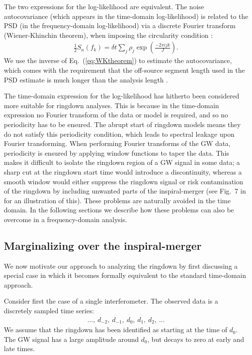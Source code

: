 The two expressions for the log-likelihood are equivalent.
The noise autocovariance (which appears in the time-domain log-likelihood) is related to the PSD (in the frequency-domain log-likelihood) via a discrete Fourier transform (Wiener-Khinchin theorem), when imposing the circularity condition \cite{Isi:2021iql}:
\begin{align} \label{eq:WKtheorem}
	\frac{1}{2}S_n(f_k) = \delta t \sum_{j}\rho_j \exp\left(\frac{-2\pi ijk}{J}\right).
\end{align}
We use the inverse of Eq.~(\ref{eq:WKtheorem}) to estimate the autocovariance, which comes with the requirement that the off-source segment length used in the PSD estimate is much longer than the analysis length \cite{Isi:2021iql}.

The time-domain expression for the log-likelihood has hitherto been considered more suitable for ringdown analyses.
This is because in the time-domain expression no Fourier transform of the data or model is required, and so no periodicity has to be ensured.
The abrupt start of ringdown models means they do not satisfy this periodicity condition, which leads to spectral leakage upon Fourier transforming. 
When performing Fourier transforms of the GW data, periodicity is ensured by applying window functions to taper the data.
This makes it difficult to isolate the ringdown region of a GW signal in some data; a sharp cut at the ringdown start time would introduce a discontinuity, whereas a smooth window would either suppress the ringdown signal or risk contamination of the ringdown by including unwanted parts of the inspiral-merger (see Fig.~7 in \cite{Isi:2021iql} for an illustration of this). These problems are naturally avoided in the time domain. 
In the following sections we describe how these problems can also be overcome in a frequency-domain analysis.


\subsection{Marginalizing over the inspiral-merger}\label{subsec:motivation}

We now motivate our approach to analyzing the ringdown by first discussing a special case in which it becomes formally equivalent to the standard time-domain approach. 

Consider first the case of a single interferometer.
The observed data is a discretely sampled time series:
\begin{align}
	\ldots,\ d_{-2},\ d_{-1},\ d_{0},\ d_{1},\ d_{2},\ \ldots
\end{align}
We assume that the ringdown has been identified as starting at the time of $d_0$.
The GW signal has a large amplitude around $d_0$, but decays to zero at early and late times.

